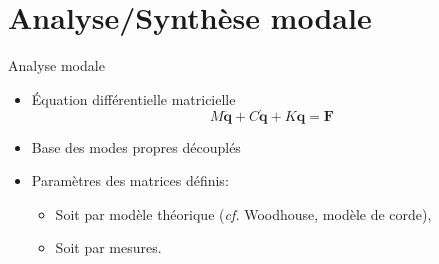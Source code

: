 \section{Analyse/Synthèse modale}

\begin{frame}{Analyse modale}
 \begin{itemize}
  \item Équation différentielle matricielle
    \[ M \ddot{\bm{q}} + C \dot{\bm{q}} + K \bm{q} = \bm{F} \]
  \item Base des modes propres découplés
  \item Paramètres des matrices définis:
    \begin{itemize}
     \item Soit par modèle théorique (\emph{cf.} Woodhouse, modèle de corde),
     \item Soit par mesures.
    \end{itemize}
 \end{itemize}
\end{frame}
